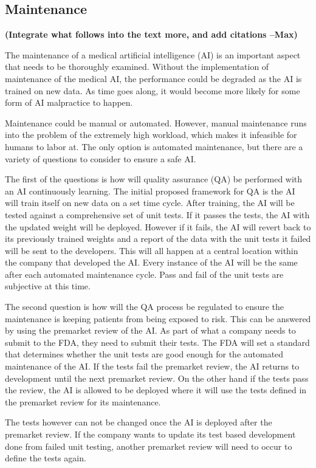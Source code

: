 \documentclass[]{article}
\begin{document}
		\subsection{Maintenance}
			\textbf{(Integrate what follows into the text more, and add citations --Max)}

			The maintenance of a medical artificial intelligence (AI) is an important aspect that needs to be thoroughly examined. Without the implementation of maintenance of the medical AI, the performance could be degraded as the AI is trained on new data. As time goes along, it would become more likely for some form of AI malpractice to happen.
		
			Maintenance could be manual or automated. However, manual maintenance runs into the problem of the extremely high workload, which makes it infeasible for humans to labor at. The only option is automated maintenance, but there are a variety of questions to consider to ensure a safe AI.
		
			The first of the questions is how will quality assurance (QA) be performed with an AI continuously learning. The initial proposed framework for QA is the AI will train itself on new data on a set time cycle. After training, the AI will be tested against a comprehensive set of unit tests. If it passes the tests, the AI with the updated weight will be deployed. However if it fails, the AI will revert back to its previously trained weights and a report of the data with the unit tests it failed will be sent to the developers. This will all happen at a central location within the company that developed the AI. Every instance of the AI will be the same after each automated maintenance cycle. Pass and fail of the unit tests are subjective at this time.

			The second question is how will the QA process be regulated to ensure the maintenance is keeping patients from being exposed to risk. This can be answered by using the premarket review of the AI. As part of what a company needs to submit to the FDA, they need to submit their tests. The FDA will set a standard that determines whether the unit tests are good enough for the automated maintenance of the AI. If the tests fail the premarket review, the AI returns to development until the next premarket review. On the other hand if the tests pass the review, the AI is allowed to be deployed where it will use the tests defined in the premarket review for its maintenance.

			The tests however can not be changed once the AI is deployed after the premarket review. If the company wants to update its test based development done from failed unit testing, another premarket review will need to occur to define the tests again.
\end{document}
